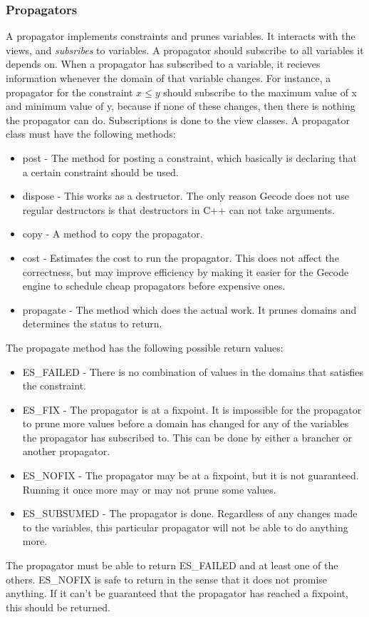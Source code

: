 \documentclass[a4paper,11pt]{article}
\begin{document}
\subsubsection{Propagators}
\label{sec:propagators}
A propagator implements constraints and prunes variables. It interacts with the views, and \textit{subsribes} to variables. A propagator should subscribe to all variables it depends on. When a propagator has subscribed to a variable, it recieves information whenever the domain of that variable changes. For instance, a propagator for the constraint $x\le y$ should subscribe to the maximum value of x and minimum value of y, because if none of these changes, then there is nothing the propagator can do. Subscriptions is done to the view classes. A propagator class must have the following methods:
\begin{itemize}
\item{post} - The method for posting a constraint, which basically is declaring that a certain constraint should be used.
\item{dispose} - This works as a destructor. The only reason Gecode does not use regular destructors is that destructors in C++ can not take arguments.
\item{copy} - A method to copy the propagator.
\item{cost} - Estimates the cost to run the propagator. This does not affect the correctness, but may improve efficiency by making it easier for the Gecode engine to schedule cheap propagators before expensive ones.
\item{propagate} - The method which does the actual work. It prunes domains and determines the status to return.
\end{itemize}
The propagate method has the following possible return values:
\begin{itemize}
\item{ES\_FAILED} - There is no combination of values in the domains that satisfies the constraint. 
\item{ES\_FIX} - The propagator is at a fixpoint. It is impossible for the propagator to prune more values before a domain has changed for any of the variables the propagator has subscribed to. This can be done by either a brancher or another propagator.
\item{ES\_NOFIX} - The propagator may be at a fixpoint, but it is not guaranteed. Running it once more may or may not prune some values. 
\item{ES\_SUBSUMED} - The propagator is done. Regardless of any changes made to the variables, this particular propagator will not be able to do anything more.
\end{itemize}
The propagator must be able to return ES\_FAILED and at least one of the others. ES\_NOFIX is safe to return in the sense that it does not promise anything. If it can't be guaranteed that the propagator has reached a fixpoint, this should be returned. 
\end{document}
